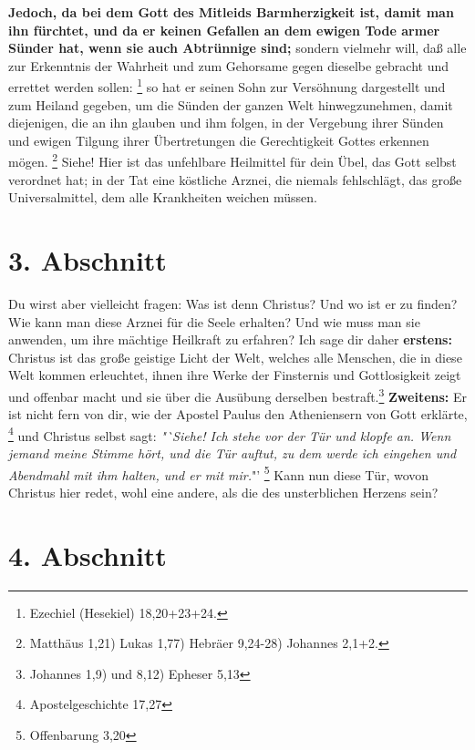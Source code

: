 \textbf{Jedoch, da bei dem Gott des Mitleids Barmherzigkeit ist, damit man ihn
fürchtet, und da er keinen Gefallen an dem ewigen Tode  armer
Sünder hat, wenn
sie auch Abtrünnige sind;} sondern vielmehr will, daß alle zur Erkenntnis der
Wahrheit und zum Gehorsame gegen dieselbe gebracht und errettet werden
sollen:
\footnote{Ezechiel (Hesekiel) 18,20+23+24.}
 so hat er seinen Sohn zur
Versöhnung
dargestellt und zum Heiland gegeben, um die Sünden der ganzen Welt
hinwegzunehmen, damit diejenigen, die an ihn glauben und ihm folgen, in der
Vergebung ihrer Sünden und ewigen Tilgung ihrer Übertretungen die
Gerechtigkeit Gottes erkennen mögen.
\footnote{Matthäus 1,21) Lukas 1,77) Hebräer 9,24-28) Johannes 2,1+2.}
Siehe! Hier ist das unfehlbare Heilmittel für dein
Übel, das Gott selbst verordnet hat; in der Tat eine köstliche Arznei, die
niemals fehlschlägt, das große Universalmittel, dem alle Krankheiten weichen
müssen.

\section{3. Abschnitt}  \label{kap2_ab3}

Du wirst aber vielleicht fragen: Was ist denn Christus? Und wo ist er zu finden?
Wie kann man diese Arznei für die Seele erhalten? Und wie muss man sie anwenden,
um ihre mächtige Heilkraft zu erfahren? Ich sage dir daher \textbf{erstens:}
Christus ist das große geistige Licht der Welt, welches alle Menschen, die in
diese Welt kommen erleuchtet, ihnen ihre Werke der Finsternis und Gottlosigkeit
zeigt und offenbar macht und sie über die Ausübung derselben
bestraft.\footnote{Johannes 1,9) und 8,12) Epheser 5,13}
\textbf{Zweitens:} Er ist nicht fern von dir, wie der
Apostel Paulus den Atheniensern von Gott erklärte,
\footnote{Apostelgeschichte 17,27}
und Christus selbst sagt:
\textit{"`Siehe! Ich stehe vor der Tür und klopfe an.
Wenn jemand meine Stimme hört, und die Tür auftut, zu dem werde ich eingehen
und Abendmahl mit ihm halten, und er mit mir.}"'
\footnote{Offenbarung 3,20}
Kann 
nun diese Tür, wovon Christus hier redet, wohl eine andere, als die des
unsterblichen Herzens sein?

\section{4. Abschnitt}  \label{kap2_ab4}

